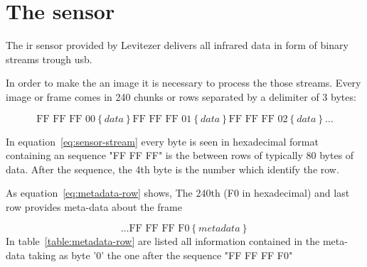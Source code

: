 \documentclass[hidelinks,11pt,a4paper,oneside,article]{memoir}
\begin{document}
\section{The sensor}
The \gls{ir} sensor provided by Levitezer delivers all infrared data in form of binary streams trough \gls{usb}.

 In order to make the an image it is necessary to process the those streams. Every image or frame comes in 240 chunks or rows separated by a delimiter of 3 bytes:

\begin{equation}
\label{eq:sensor-stream}
\text {FF FF FF 00} \left\lbrace data \right\rbrace 
\text {FF FF FF 01} \left\lbrace data \right\rbrace 
\text {FF FF FF 02} \left\lbrace data \right\rbrace \dots
\end{equation}



In equation~\ref{eq:sensor-stream} every byte is seen in hexadecimal format containing an sequence "FF FF FF" is the between rows of typically 80 bytes of data. After the sequence, the 4th byte is the number which identify the row.

As equation~\ref{eq:metadata-row} shows, The 240th (F0 in hexadecimal) and last row provides meta-data about the frame

\begin{equation}
\label{eq:metadata-row}
\dots \text {FF FF FF F0} \left\lbrace metadata \right\rbrace
\end{equation}
In table~\ref{table:metadata-row} are listed all information contained in the meta-data taking as byte '0' the one after the sequence "FF FF FF F0"
\end{document}

